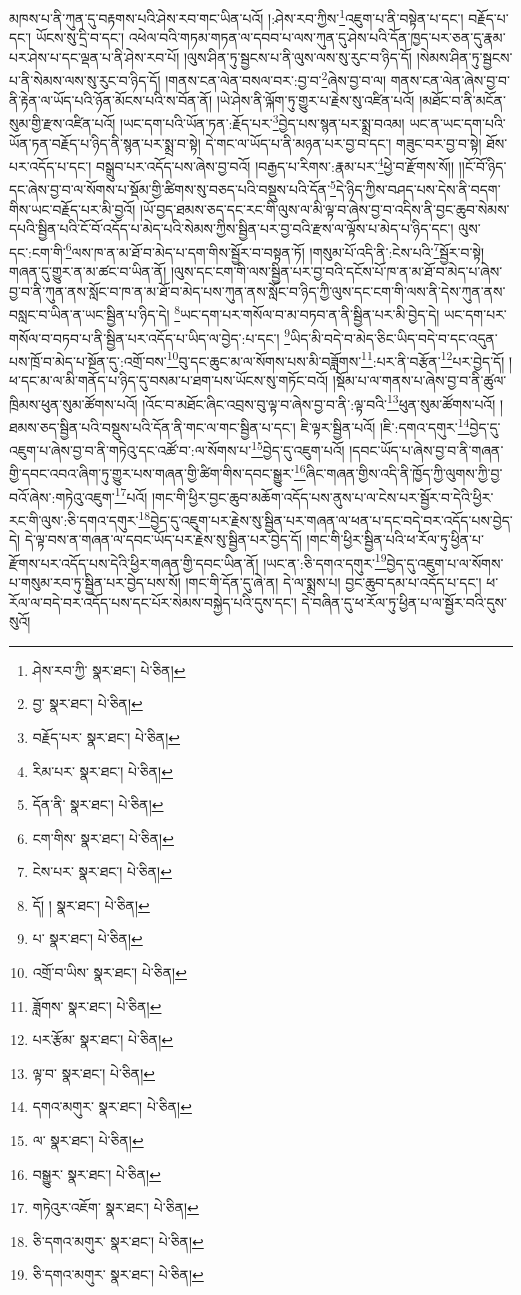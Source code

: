 མཁས་པ་ནི་ཀུན་དུ་བརྟགས་པའི་ཤེས་རབ་གང་ཡིན་པའོ། །:ཤེས་རབ་ཀྱིས་\footnote{ཤེས་རབ་ཀྱི་  སྣར་ཐང་།  པེ་ཅིན། }འཇུག་པ་ནི་བསྟེན་པ་དང་། བརྗོད་པ་དང་། ཡོངས་སུ་དྲི་བ་དང་། འཕེལ་བའི་གཏམ་གཏན་ལ་དབབ་པ་ལས་ཀུན་དུ་ཤེས་པའི་དོན་ཁྱད་པར་ཅན་དུ་རྣམ་པར་ཤེས་པ་དང་ལྡན་པ་ནི་ཤེས་རབ་པོ། །ལུས་ཤིན་ཏུ་སྦྱངས་པ་ནི་ལུས་ལས་སུ་རུང་བ་ཉིད་དོ། །སེམས་ཤིན་ཏུ་སྦྱངས་པ་ནི་སེམས་ལས་སུ་རུང་བ་ཉིད་དོ། །གནས་ངན་ལེན་བསལ་བར་:བྱ་བ་\footnote{བྱ་  སྣར་ཐང་།  པེ་ཅིན། }ཞེས་བྱ་བ་ལ། གནས་ངན་ལེན་ཞེས་བྱ་བ་ནི་རྟེན་ལ་ཡོད་པའི་ཉོན་མོངས་པའི་ས་བོན་ནོ། །ཡེ་ཤེས་ནི་ལྐོག་ཏུ་གྱུར་པ་རྗེས་སུ་འཛིན་པའོ། །མཐོང་བ་ནི་མངོན་སུམ་གྱི་རྫས་འཛིན་པའོ། །ཡང་དག་པའི་ཡོན་ཏན་:རྗོད་པར་\footnote{བརྗོད་པར་  སྣར་ཐང་།  པེ་ཅིན། }བྱེད་པས་སྙན་པར་སྨྲ་བའམ། ཡང་ན་ཡང་དག་པའི་ཡོན་ཏན་བརྗོད་པ་ཉིད་ནི་སྙན་པར་སྨྲ་བ་སྟེ། དེ་གང་ལ་ཡོད་པ་ནི་མཉན་པར་བྱ་བ་དང་། གཟུང་བར་བྱ་བ་སྟེ། ཐོས་པར་འདོད་པ་དང་། བསྒྲུབ་པར་འདོད་པས་ཞེས་བྱ་བའོ། །བརྒྱད་པ་རིགས་:རྣམ་པར་\footnote{རིམ་པར་  སྣར་ཐང་།  པེ་ཅིན། }ཕྱེ་བ་རྫོགས་སོ།། །།ངོ་བོ་ཉིད་དང་ཞེས་བྱ་བ་ལ་སོགས་པ་སྡོམ་གྱི་ཚིགས་སུ་བཅད་པའི་བསྡུས་པའི་དོན་\footnote{དོན་ནི་  སྣར་ཐང་།  པེ་ཅིན། }དེ་ཉིད་ཀྱིས་བཤད་པས་དེས་ནི་བདག་གིས་ཡང་བརྗོད་པར་མི་བྱའོ། །ཡོ་བྱད་ཐམས་ཅད་དང་རང་གི་ལུས་ལ་མི་ལྟ་བ་ཞེས་བྱ་བ་འདིས་ནི་བྱང་ཆུབ་སེམས་དཔའི་སྦྱིན་པའི་ངོ་བོ་འདོད་པ་མེད་པའི་སེམས་ཀྱིས་སྦྱིན་པར་བྱ་བའི་རྫས་ལ་ལྟོས་པ་མེད་པ་ཉིད་དང་། ལུས་དང་:ངག་གི་\footnote{ངག་གིས་  སྣར་ཐང་།  པེ་ཅིན། }ལས་ཁ་ན་མ་ཐོ་བ་མེད་པ་དག་གིས་སྦྱོར་བ་བསྟན་ཏོ། །གསུམ་པོ་འདི་ནི་:ངེས་པའི་\footnote{ངེས་པར་  སྣར་ཐང་།  པེ་ཅིན། }སྦྱོར་བ་སྟེ། གཞན་དུ་གྱུར་ན་མ་ཚང་བ་ཡིན་ནོ། །ལུས་དང་ངག་གི་ལས་སྦྱིན་པར་བྱ་བའི་དངོས་པོ་ཁ་ན་མ་ཐོ་བ་མེད་པ་ཞེས་བྱ་བ་ནི་ཀུན་ནས་སློང་བ་ཁ་ན་མ་ཐོ་བ་མེད་པས་ཀུན་ནས་སློང་བ་ཉིད་ཀྱི་ལུས་དང་ངག་གི་ལས་ནི་དེས་ཀུན་ནས་བསླང་བ་ཡིན་ན་ཡང་སྦྱིན་པ་ཉིད་དེ། \footnote{དོ། །   སྣར་ཐང་།  པེ་ཅིན། }ཡང་དག་པར་གསོལ་བ་མ་བཏབ་ན་ནི་སྦྱིན་པར་མི་བྱེད་དེ། ཡང་དག་པར་གསོལ་བ་བཏབ་པ་ནི་སྦྱིན་པར་འདོད་པ་ཡིད་ལ་བྱེད་:པ་དང་། \footnote{པ་  སྣར་ཐང་།  པེ་ཅིན། }ཡིད་མི་བདེ་བ་མེད་ཅིང་ཡིད་བདེ་བ་དང་འདུན་པས་ཁྲོ་བ་མེད་པ་སྔོན་དུ་:འགྲོ་བས་\footnote{འགྲོ་བ་ཡིས་  སྣར་ཐང་།  པེ་ཅིན། }བུ་དང་ཆུང་མ་ལ་སོགས་པས་མི་བཟློགས་\footnote{ཟློགས་  སྣར་ཐང་།  པེ་ཅིན། }:པར་ནི་བརྩོན་\footnote{པར་རྩོམ་  སྣར་ཐང་།  པེ་ཅིན། }པར་བྱེད་དོ། །ཕ་དང་མ་ལ་མི་གནོད་པ་ཉིད་དུ་བསམ་པ་ཐག་པས་ཡོངས་སུ་གཏོང་བའོ། །སྡོམ་པ་ལ་གནས་པ་ཞེས་བྱ་བ་ནི་ཚུལ་ཁྲིམས་ཕུན་སུམ་ཚོགས་པའོ། །འོང་བ་མཐོང་ཞིང་འབྲས་བུ་ལྟ་བ་ཞེས་བྱ་བ་ནི་:ལྟ་བའི་\footnote{ལྟ་བ་  སྣར་ཐང་།  པེ་ཅིན། }ཕུན་སུམ་ཚོགས་པའོ། །ཐམས་ཅད་སྦྱིན་པའི་བསྡུས་པའི་དོན་ནི་གང་ལ་གང་སྦྱིན་པ་དང་། ཇི་ལྟར་སྦྱིན་པའོ། །ཇི་:དགའ་དགུར་\footnote{དགའ་མགུར་  སྣར་ཐང་།  པེ་ཅིན། }བྱེད་དུ་འཇུག་པ་ཞེས་བྱ་བ་ནི་གཏེའུ་དང་འཚོ་བ་:ལ་སོགས་པ་\footnote{ལ་  སྣར་ཐང་།  པེ་ཅིན། }བྱེད་དུ་འཇུག་པའོ། །དབང་ཡོད་པ་ཞེས་བྱ་བ་ནི་གཞན་གྱི་དབང་འབའ་ཞིག་ཏུ་གྱུར་པས་གཞན་གྱི་ཚིག་གིས་དབང་སྒྱུར་\footnote{བསྒྱུར་  སྣར་ཐང་།  པེ་ཅིན། }ཞིང་གཞན་གྱིས་འདི་ནི་ཁྱོད་ཀྱི་ལུགས་ཀྱི་བྱ་བའོ་ཞེས་:གཏེའུ་འཇུག་\footnote{གཏེའུར་འཇོག་  སྣར་ཐང་།  པེ་ཅིན། }པའོ། །གང་གི་ཕྱིར་བྱང་ཆུབ་མཆོག་འདོད་པས་ནུས་པ་ལ་ངེས་པར་སྦྱོར་བ་དེའི་ཕྱིར་རང་གི་ལུས་:ཅི་དགའ་དགུར་\footnote{ཅི་དགའ་མགུར་  སྣར་ཐང་།  པེ་ཅིན། }བྱེད་དུ་འཇུག་པར་རྗེས་སུ་སྦྱིན་པར་གཞན་ལ་ཕན་པ་དང་བདེ་བར་འདོད་པས་བྱེད་དེ། དེ་ལྟ་བས་ན་གཞན་ལ་དབང་ཡོད་པར་རྗེས་སུ་སྦྱིན་པར་བྱེད་དོ། །གང་གི་ཕྱིར་སྦྱིན་པའི་ཕ་རོལ་ཏུ་ཕྱིན་པ་རྫོགས་པར་འདོད་པས་དེའི་ཕྱིར་གཞན་གྱི་དབང་ཡིན་ནོ། །ཡང་ན་:ཅི་དགའ་དགུར་\footnote{ཅི་དགའ་མགུར་  སྣར་ཐང་།  པེ་ཅིན། }བྱེད་དུ་འཇུག་པ་ལ་སོགས་པ་གསུམ་རབ་ཏུ་སྦྱིན་པར་བྱེད་པས་སོ། །གང་གི་དོན་དུ་ཞེ་ན། དེ་ལ་སྨྲས་པ། བྱང་ཆུབ་དམ་པ་འདོད་པ་དང་། ཕ་རོལ་ལ་བདེ་བར་འདོད་པས་དང་པོར་སེམས་བསྐྱེད་པའི་དུས་དང་། དེ་བཞིན་དུ་ཕ་རོལ་ཏུ་ཕྱིན་པ་ལ་སྦྱོར་བའི་དུས་སུའོ། 